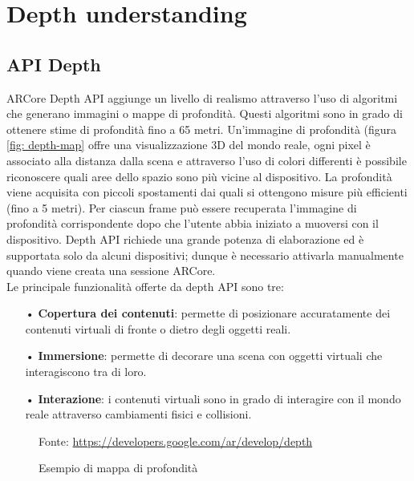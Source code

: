 \documentclass[crop=false, class=book]{standalone}
\begin{document}
		
	\chapter{Depth understanding}
	
		\section{API Depth}
	
			ARCore Depth API aggiunge un livello di realismo attraverso l'uso di algoritmi che generano immagini o mappe di 				profondità. Questi algoritmi sono in grado di ottenere stime di profondità fino a 65 metri. Un'immagine di 						profondità 	(figura \vref{fig: depth-map} offre una visualizzazione 3D del mondo reale, ogni pixel è 							associato alla distanza dalla scena e attraverso l'uso di colori differenti è possibile riconoscere quali aree 					dello spazio sono più vicine al dispositivo. La profondità viene acquisita con piccoli spostamenti dai quali si 				ottengono misure più efficienti (fino a 5 metri). Per ciascun frame può essere recuperata 										l'immagine di profondità corrispondente dopo che l'utente abbia iniziato a muoversi con il dispositivo. Depth API 				richiede una grande potenza di elaborazione ed è supportata solo da alcuni dispositivi; dunque è necessario 					attivarla manualmente quando viene creata una sessione ARCore.\\
		 	Le principale funzionalità offerte da depth API sono tre:
		\begin{itemize}
			\item[•] \textbf{Copertura dei contenuti}: permette di posizionare accuratamente dei contenuti virtuali di fronte o dietro degli oggetti reali.
			\item[•] \textbf{Immersione}: permette di decorare una scena con oggetti virtuali che interagiscono tra di loro.
			\item[•] \textbf{Interazione}: i contenuti virtuali sono in grado di interagire con il mondo reale attraverso cambiamenti fisici e collisioni.
		\end{itemize}
		
			\begin{figure}
				\centering
				{Fonte: \url{https://developers.google.com/ar/develop/depth}}
				\caption{Esempio di mappa di profondità}
				\label{fig: depth-map}
			\end{figure}	
		
\end{document}
